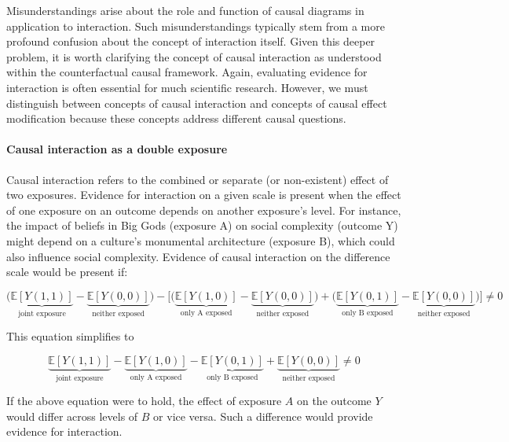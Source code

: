 \documentclass[
  singlecolumn,
  9pt]{article}
\let\oldparagraph\paragraph
\renewcommand{\paragraph}[1]{\oldparagraph{#1}\mbox{}}
\begin{document}
Misunderstandings arise about the role and function of causal diagrams
in application to interaction. Such misunderstandings typically stem
from a more profound confusion about the concept of interaction itself.
Given this deeper problem, it is worth clarifying the concept of causal
interaction as understood within the counterfactual causal framework.
Again, evaluating evidence for interaction is often essential for much
scientific research. However, we must distinguish between concepts of
causal interaction and concepts of causal effect modification because
these concepts address different causal questions.

\paragraph{\texorpdfstring{\textbf{Causal interaction as a double
exposure}}{Causal interaction as a double exposure}}\label{causal-interaction-as-a-double-exposure}

Causal interaction refers to the combined or separate (or non-existent)
effect of two exposures. Evidence for interaction on a given scale is
present when the effect of one exposure on an outcome depends on another
exposure's level. For instance, the impact of beliefs in Big Gods
(exposure A) on social complexity (outcome Y) might depend on a
culture's monumental architecture (exposure B), which could also
influence social complexity. Evidence of causal interaction on the
difference scale would be present if:

\[\bigg(\underbrace{\mathbb{E}[Y(1,1)]}_{\text{joint exposure}} - \underbrace{\mathbb{E}[Y(0,0)]}_{\text{neither exposed}}\bigg) - \bigg[ \bigg(\underbrace{\mathbb{E}[Y(1,0)]}_{\text{only A exposed}} - \underbrace{\mathbb{E}[Y(0,0)]}_{\text{neither exposed}}\bigg) + \bigg(\underbrace{\mathbb{E}[Y(0,1)]}_{\text{only B exposed}} - \underbrace{\mathbb{E}[Y(0,0)]}_{\text{neither exposed}} \bigg)\bigg] \neq 0 \]

This equation simplifies to

\[ \underbrace{\mathbb{E}[Y(1,1)]}_{\text{joint exposure}} - \underbrace{\mathbb{E}[Y(1,0)]}_{\text{only A exposed}} - \underbrace{\mathbb{E}[Y(0,1)]}_{\text{only B exposed}} + \underbrace{\mathbb{E}[Y(0,0)]}_{\text{neither exposed}} \neq 0 \]

If the above equation were to hold, the effect of exposure \(A\) on the
outcome \(Y\) would differ across levels of \(B\) or vice versa. Such a
difference would provide evidence for interaction.
\end{document}
